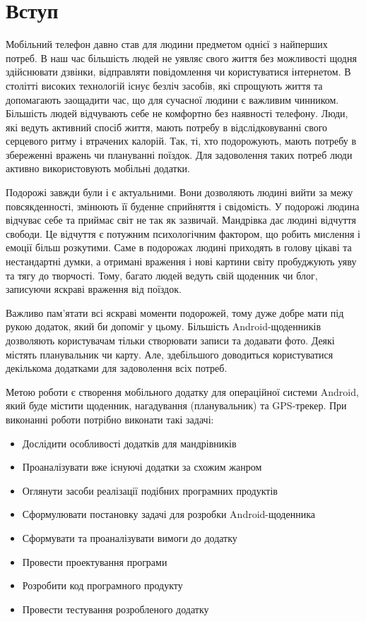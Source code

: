 \documentclass[../main.tex]{subfiles}
\begin{document}
\chapter*{Вступ}

Мобільний телефон давно став для людини предметом однієї з найперших потреб. В наш час більшість людей не уявляє свого життя без можливості щодня здійснювати дзвінки, відправляти повідомлення чи користуватися інтернетом. В столітті високих технологій існує безліч засобів, які спрощують життя та допомагають заощадити час, що для сучасної людини є важливим чинником. Більшість людей відчувають себе не комфортно без наявності телефону. Люди, які ведуть активний спосіб життя, мають потребу в відслідковуванні свого серцевого ритму і втрачених калорій. Так, ті, хто подорожують, мають потребу в збереженні вражень чи плануванні поїздок. Для задоволення таких потреб люди активно використовують мобільні додатки.

Подорожі завжди були і є актуальними. Вони дозволяють людині вийти за межу повсякденності, змінюють її буденне сприйняття і свідомість. У подорожі людина відчуває себе та приймає світ не так як зазвичай. Мандрівка дає людині відчуття свободи. Це відчуття є потужним психологічним фактором, що робить мислення і емоції більш розкутими. Саме в подорожах людині приходять в голову цікаві та нестандартні думки, а отримані враження і нові картини світу пробуджують уяву та тягу до творчості. Тому, багато людей ведуть свій щоденник чи блог, записуючи яскраві враження від поїздок. 

Важливо пам'ятати всі яскраві моменти подорожей, тому дуже добре мати під рукою додаток, який би допоміг у цьому. Більшість Android-щоденників дозволяють користувачам тільки створювати записи та додавати фото. Деякі містять планувальник чи карту. Але, здебільшого доводиться користуватися декількома додатками для задоволення всіх потреб.

Метою роботи є створення мобільного додатку для операційної системи Android, який буде містити щоденник, нагадування (планувальник) та GPS-трекер.  
При виконанні роботи потрібно виконати такі задачі:
\begin{itemize}
\item Дослідити особливості додатків для мандрівників
\item Проаналізувати вже існуючі додатки за схожим жанром
\item Оглянути засоби реалізації подібних програмних продуктів
\item Сформулювати постановку задачі для розробки Android-щоденника
\item Сформувати та проаналізувати вимоги до додатку
\item Провести проектування програми
\item Розробити код програмного продукту
\item Провести тестування розробленого додатку
\end{itemize}
\end{document}
